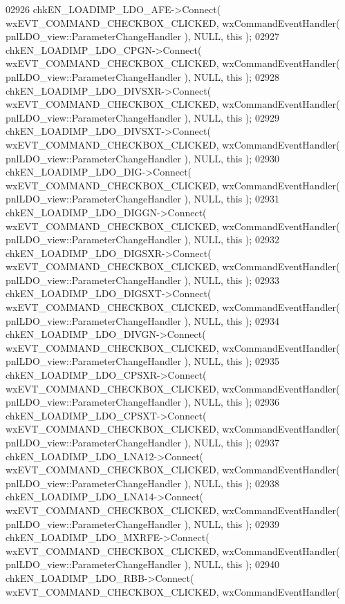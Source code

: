 \begin{DoxyCode}
02926     chkEN_LOADIMP_LDO_AFE->Connect( wxEVT\_COMMAND\_CHECKBOX\_CLICKED, wxCommandEventHandler( 
      pnlLDO_view::ParameterChangeHandler ), NULL, \textcolor{keyword}{this} );
02927     chkEN_LOADIMP_LDO_CPGN->Connect( wxEVT\_COMMAND\_CHECKBOX\_CLICKED, wxCommandEventHandler( 
      pnlLDO_view::ParameterChangeHandler ), NULL, \textcolor{keyword}{this} );
02928     chkEN_LOADIMP_LDO_DIVSXR->Connect( wxEVT\_COMMAND\_CHECKBOX\_CLICKED, wxCommandEventHandler( 
      pnlLDO_view::ParameterChangeHandler ), NULL, \textcolor{keyword}{this} );
02929     chkEN_LOADIMP_LDO_DIVSXT->Connect( wxEVT\_COMMAND\_CHECKBOX\_CLICKED, wxCommandEventHandler( 
      pnlLDO_view::ParameterChangeHandler ), NULL, \textcolor{keyword}{this} );
02930     chkEN_LOADIMP_LDO_DIG->Connect( wxEVT\_COMMAND\_CHECKBOX\_CLICKED, wxCommandEventHandler( 
      pnlLDO_view::ParameterChangeHandler ), NULL, \textcolor{keyword}{this} );
02931     chkEN_LOADIMP_LDO_DIGGN->Connect( wxEVT\_COMMAND\_CHECKBOX\_CLICKED, wxCommandEventHandler( 
      pnlLDO_view::ParameterChangeHandler ), NULL, \textcolor{keyword}{this} );
02932     chkEN_LOADIMP_LDO_DIGSXR->Connect( wxEVT\_COMMAND\_CHECKBOX\_CLICKED, wxCommandEventHandler( 
      pnlLDO_view::ParameterChangeHandler ), NULL, \textcolor{keyword}{this} );
02933     chkEN_LOADIMP_LDO_DIGSXT->Connect( wxEVT\_COMMAND\_CHECKBOX\_CLICKED, wxCommandEventHandler( 
      pnlLDO_view::ParameterChangeHandler ), NULL, \textcolor{keyword}{this} );
02934     chkEN_LOADIMP_LDO_DIVGN->Connect( wxEVT\_COMMAND\_CHECKBOX\_CLICKED, wxCommandEventHandler( 
      pnlLDO_view::ParameterChangeHandler ), NULL, \textcolor{keyword}{this} );
02935     chkEN_LOADIMP_LDO_CPSXR->Connect( wxEVT\_COMMAND\_CHECKBOX\_CLICKED, wxCommandEventHandler( 
      pnlLDO_view::ParameterChangeHandler ), NULL, \textcolor{keyword}{this} );
02936     chkEN_LOADIMP_LDO_CPSXT->Connect( wxEVT\_COMMAND\_CHECKBOX\_CLICKED, wxCommandEventHandler( 
      pnlLDO_view::ParameterChangeHandler ), NULL, \textcolor{keyword}{this} );
02937     chkEN_LOADIMP_LDO_LNA12->Connect( wxEVT\_COMMAND\_CHECKBOX\_CLICKED, wxCommandEventHandler( 
      pnlLDO_view::ParameterChangeHandler ), NULL, \textcolor{keyword}{this} );
02938     chkEN_LOADIMP_LDO_LNA14->Connect( wxEVT\_COMMAND\_CHECKBOX\_CLICKED, wxCommandEventHandler( 
      pnlLDO_view::ParameterChangeHandler ), NULL, \textcolor{keyword}{this} );
02939     chkEN_LOADIMP_LDO_MXRFE->Connect( wxEVT\_COMMAND\_CHECKBOX\_CLICKED, wxCommandEventHandler( 
      pnlLDO_view::ParameterChangeHandler ), NULL, \textcolor{keyword}{this} );
02940     chkEN_LOADIMP_LDO_RBB->Connect( wxEVT\_COMMAND\_CHECKBOX\_CLICKED, wxCommandEventHandler( 

\end{DoxyCode}
